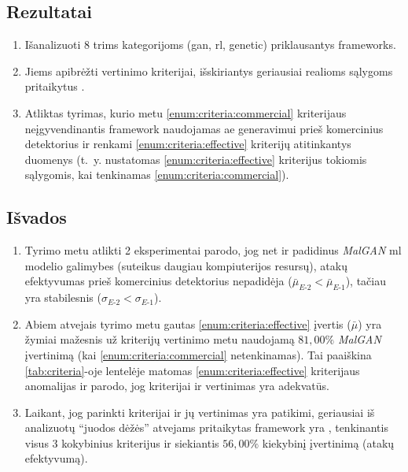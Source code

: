 
\subsection*{Rezultatai}
\begin{enumerate}
    \item Išanalizuoti 8 trims kategorijoms (\acs{gan}, \acs{rl}, \acs{genetic}) priklausantys  \glspl{framework}. 
    \item Jiems apibrėžti vertinimo kriterijai, išskiriantys geriausiai realioms sąlygoms pritaikytus .
    \item Atliktas tyrimas, kurio metu \ref{enum:criteria:commercial} kriterijaus neįgyvendinantis \gls{framework}  naudojamas \acs{ae} generavimui prieš komercinius detektorius ir renkami \ref{enum:criteria:effective} kriterijų atitinkantys duomenys (t.~y. nustatomas  \ref{enum:criteria:effective} kriterijus tokiomis sąlygomis, kai tenkinamas \ref{enum:criteria:commercial}).
\end{enumerate}

\subsection*{Išvados}
\begin{enumerate}
    \item Tyrimo metu atlikti 2 eksperimentai parodo, jog net ir padidinus \textit{MalGAN} \acs{ml} modelio galimybes (suteikus daugiau kompiuterijos resursų), atakų efektyvumas prieš komercinius detektorius nepadidėja ($\bar{\mu}_{E \text{-} 2} < \bar{\mu}_{E \text{-} 1}$), tačiau yra stabilesnis ($\sigma_{E \text{-} 2} < \sigma_{E \text{-} 1}$).
    \item Abiem atvejais tyrimo metu gautas \ref{enum:criteria:effective} įvertis ($\bar{\mu}$) yra žymiai mažesnis už kriterijų vertinimo metu naudojamą $81,00\%$ \textit{MalGAN}  įvertinimą (kai \ref{enum:criteria:commercial} netenkinamas). Tai paaiškina \ref{tab:criteria}-oje lentelėje matomas \ref{enum:criteria:effective} kriterijaus anomalijas ir parodo, jog kriterijai ir  vertinimas yra adekvatūs.
    \item Laikant, jog parinkti kriterijai ir jų vertinimas yra patikimi, geriausiai iš analizuotų  \enquote{juodos dėžės} atvejams pritaikytas \gls{framework} yra , tenkinantis visus 3 kokybinius kriterijus ir siekiantis $56,00\%$ kiekybinį įvertinimą (atakų efektyvumą).
\end{enumerate}

